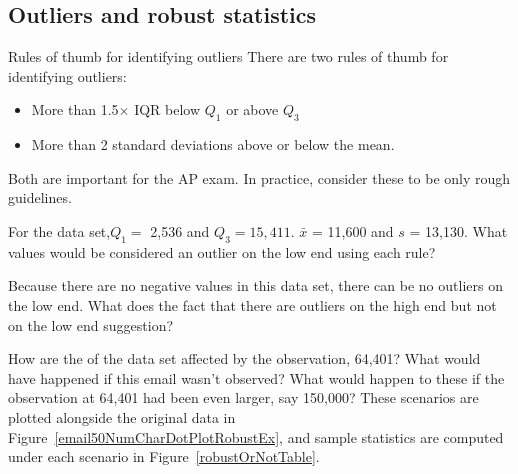 \subsection{Outliers and robust statistics}

\begin{onebox}{Rules of thumb for identifying outliers}
There are two rules of thumb for identifying outliers:
\begin{itemize}
\setlength{\itemsep}{0mm}
\item More than 1.5$\times$ IQR below $Q_1$ or above $Q_3$
\item More than 2 standard deviations above or below the mean.
\end{itemize}
Both are important for the AP exam. In practice, consider these to be only rough guidelines.\end{onebox}

\begin{exercisewrap}
\begin{nexercise}For the  data set,$Q_1=$ 2,536 and $Q_3=15,411$. $\bar{x}$ = 11,600  and $s$ = 13,130. What values would be considered an outlier on the low end using each rule?\footnotemark
\end{nexercise}
\end{exercisewrap}


\begin{exercisewrap}
\begin{nexercise} Because there are no negative values in this data set, there can be no outliers on the low end. What does the fact that there are outliers on the high end but not on the low end suggestion?\footnotemark
\end{nexercise}
\end{exercisewrap}

How are the  of the  data set affected by the observation, 64,401? What would have happened if this email wasn't observed? What would happen to these  if the observation at 64,401 had been even larger, say 150,000? These scenarios are plotted alongside the original data in Figure~\ref{email50NumCharDotPlotRobustEx}, and sample statistics are computed under each scenario in Figure~\ref{robustOrNotTable}.

